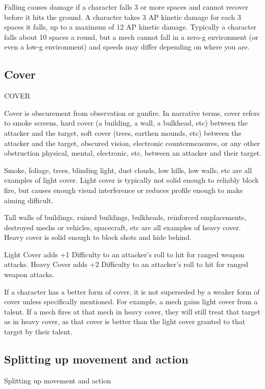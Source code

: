  
 
Falling causes damage if a character falls 3 or more spaces and cannot recover before it hits the  
ground. A character takes 3 AP kinetic damage for each 3 spaces it falls, up to a maximum of 12  
AP kinetic damage. Typically a character falls about 10 spaces a round, but a mech cannot fall in  
a zero-g environment (or even a low-g environment) and speeds may differ depending on where  
you are.
 
\subsection{Cover}
                                                     COVER  

Cover is obscurement from observation or gunfire. In narrative terms, cover refers to smoke  
screens, hard cover (a building, a wall, a bulkhead, etc) between the attacker and the target, soft  
cover (trees, earthen mounds, etc) between the attacker and the target, obscured vision,  
electronic countermeasures, or any other obstruction physical, mental, electronic, etc, between an  
attacker and their target.  

                                                                                                                    


Smoke, foliage, trees, blinding light, dust clouds, low hills, low walls, etc are all examples of light 
cover. Light cover is typically not solid enough to reliably block fire, but causes enough visual 
interference or reduces profile enough to make aiming difficult. 

Tall walls of buildings, ruined buildings, bulkheads, reinforced emplacements, destroyed mechs 
or vehicles, spacecraft, etc are all examples of heavy cover. Heavy cover is solid enough to 
block shots and hide behind. 

Light Cover adds +1 Difficulty to an attacker’s roll to hit for ranged weapon attacks. 
Heavy Cover adds +2 Difficulty to an attacker’s roll to hit for ranged weapon attacks. 

If a character has a better form of cover, it is not superseded by a weaker form of cover unless 
specifically mentioned. For example, a mech gains light cover from a talent. If a mech fires at that 
mech in heavy cover, they will still treat that target as in heavy cover, as that cover is better than 
the light cover granted to that target by their talent. 

\subsection{Splitting up movement and action}
                              Splitting up movement and action 

